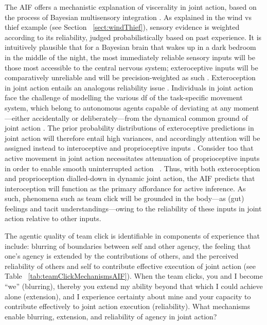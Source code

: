 \begin{CJK}{UTF8}{gbsn}
The AIF offers a mechanistic explanation of viscerality in joint action, based on the process of Bayesian multisensory integration \citep{Ernst2004}.  As explained in the wind vs thief example (see Section ~\ref{sect:windThief}), sensory evidence is weighted according to its reliability, judged probabilistically based on past experience.  It is intuitively plausible that for a Bayesian brain that wakes up in a dark bedroom in the middle of the night, the most immediately reliable sensory inputs will be those most accessible to the central nervous system;  exteroceptive inputs will be comparatively unreliable and will be precision-weighted as such \citep{Pezzulo2014}.  Exteroception in joint action entails an analogous reliability issue \citep{Sebanz2009}. Individuals in joint action face the challenge of modelling the various df of the task-specific movement system, which belong to autonomous agents capable of deviating at any moment---either accidentally or deliberately---from the dynamical common ground of joint action \citep{Keller2016}.  The prior probability distributions of exteroceptive predictions in joint action will therefore entail high variances, and accordingly attention will be assigned instead to interoceptive and proprioceptive inputs \citep{Seth2013}.  Consider too that active movement in joint action necessitates attenuation of proprioceptive inputs in order to enable smooth uninterrupted action ~\cite{Dietrich2004a,Friston2015}.  Thus, with both exteroception and proprioception dialled-down in dynamic joint action, the AIF predicts that interoception will function as the primary affordance for active inference.  As such, phenomena such as team click will be grounded in the body—as (gut) feelings and tacit understandings—owing to the reliability of these inputs in joint action relative to other inputs.

The agentic quality of team click is identifiable in components of experience that include: blurring of boundaries between self and other agency, the feeling that one's agency is extended by the contributions of others, and the perceived reliability of others and self to contribute effective execution of joint action (see Table ~\ref{tab:teamClickMechanismsAIF}).  When the team clicks, you and I become ``we'' (blurring), thereby you extend my ability beyond that which I could achieve alone (extension), and I experience certainty about mine and your capacity to contribute effectively to joint action execution (reliability).  What mechanisms enable blurring, extension, and reliability of agency in joint action?


\end{CJK}
